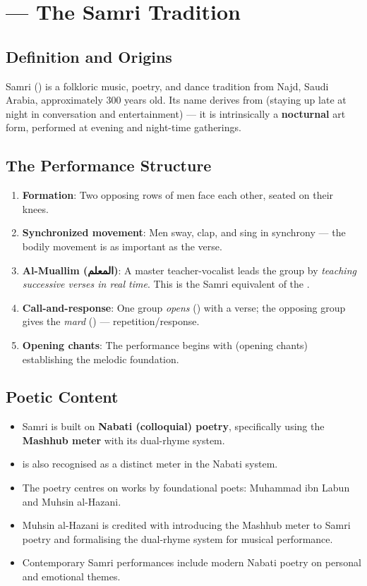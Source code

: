 \section{ — The Samri Tradition}
\label{sec:samri}

\subsection{Definition and Origins}

Samri () is a folkloric music, poetry, and dance tradition from Najd, Saudi Arabia, approximately 300 years old. Its name derives from  (staying up late at night in conversation and entertainment) — it is intrinsically a \textbf{nocturnal} art form, performed at evening and night-time gatherings.

\subsection{The Performance Structure}

\begin{enumerate}
  \item \textbf{Formation}: Two opposing rows of men face each other, seated on their knees.
  \item \textbf{Synchronized movement}: Men sway, clap, and sing in synchrony — the bodily movement is as important as the verse.
  \item \textbf{Al-Muallim (المعلم)}: A master teacher-vocalist leads the group by \textit{teaching successive verses in real time}. This is the Samri equivalent of the .
  \item \textbf{Call-and-response}: One group \textit{opens} () with a verse; the opposing group gives the \textit{mard} () — repetition/response.
  \item \textbf{Opening chants}: The performance begins with  (opening chants) establishing the melodic foundation.
\end{enumerate}

\subsection{Poetic Content}

\begin{itemize}
  \item Samri is built on \textbf{Nabati (colloquial) poetry}, specifically using the \textbf{Mashhub meter} with its dual-rhyme system.
  \item {} is also recognised as a distinct meter in the Nabati system.
  \item The poetry centres on works by foundational poets: Muhammad ibn Labun and Muhsin al-Hazani.
  \item Muhsin al-Hazani is credited with introducing the Mashhub meter to Samri poetry and formalising the dual-rhyme system for musical performance.
  \item Contemporary Samri performances include modern Nabati poetry on personal and emotional themes.
\end{itemize}

